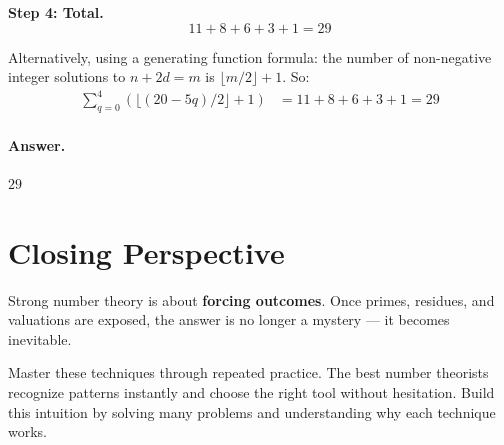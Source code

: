 \documentclass[12pt]{extarticle}
\begin{document}
\textbf{Step 4: Total.}
\[
11 + 8 + 6 + 3 + 1 = 29
\]

Alternatively, using a generating function formula: the number of non-negative integer solutions to $n + 2d = m$ is $\lfloor m/2 \rfloor + 1$. So:
\begin{align*}
\sum_{q=0}^{4} (\lfloor (20-5q)/2 \rfloor + 1) &= 11 + 8 + 6 + 3 + 1 = 29
\end{align*}

\paragraph{Answer.} $\boxed{29}$

\section*{Closing Perspective}

Strong number theory is about \textbf{forcing outcomes}. Once primes, residues, and valuations are exposed, the answer is no longer a mystery — it becomes inevitable.

Master these techniques through repeated practice. The best number theorists recognize patterns instantly and choose the right tool without hesitation. Build this intuition by solving many problems and understanding why each technique works.
\end{document}
